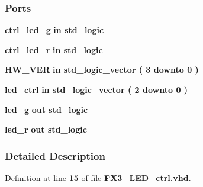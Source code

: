 \subsubsection*{Ports}
 \begin{DoxyCompactItemize}
\item 
{\bf ctrl\+\_\+led\+\_\+g}  {\bfseries {\bfseries \textcolor{keywordflow}{in}\textcolor{vhdlchar}{ }}} {\bfseries \textcolor{comment}{std\+\_\+logic}\textcolor{vhdlchar}{ }} 
\item 
{\bf ctrl\+\_\+led\+\_\+r}  {\bfseries {\bfseries \textcolor{keywordflow}{in}\textcolor{vhdlchar}{ }}} {\bfseries \textcolor{comment}{std\+\_\+logic}\textcolor{vhdlchar}{ }} 
\item 
{\bf H\+W\+\_\+\+V\+ER}  {\bfseries {\bfseries \textcolor{keywordflow}{in}\textcolor{vhdlchar}{ }}} {\bfseries \textcolor{comment}{std\+\_\+logic\+\_\+vector}\textcolor{vhdlchar}{ }\textcolor{vhdlchar}{(}\textcolor{vhdlchar}{ }\textcolor{vhdlchar}{ } \textcolor{vhdldigit}{3} \textcolor{vhdlchar}{ }\textcolor{keywordflow}{downto}\textcolor{vhdlchar}{ }\textcolor{vhdlchar}{ } \textcolor{vhdldigit}{0} \textcolor{vhdlchar}{ }\textcolor{vhdlchar}{)}\textcolor{vhdlchar}{ }} 
\item 
{\bf led\+\_\+ctrl}  {\bfseries {\bfseries \textcolor{keywordflow}{in}\textcolor{vhdlchar}{ }}} {\bfseries \textcolor{comment}{std\+\_\+logic\+\_\+vector}\textcolor{vhdlchar}{ }\textcolor{vhdlchar}{(}\textcolor{vhdlchar}{ }\textcolor{vhdlchar}{ } \textcolor{vhdldigit}{2} \textcolor{vhdlchar}{ }\textcolor{keywordflow}{downto}\textcolor{vhdlchar}{ }\textcolor{vhdlchar}{ } \textcolor{vhdldigit}{0} \textcolor{vhdlchar}{ }\textcolor{vhdlchar}{)}\textcolor{vhdlchar}{ }} 
\item 
{\bf led\+\_\+g}  {\bfseries {\bfseries \textcolor{keywordflow}{out}\textcolor{vhdlchar}{ }}} {\bfseries \textcolor{comment}{std\+\_\+logic}\textcolor{vhdlchar}{ }} 
\item 
{\bf led\+\_\+r}  {\bfseries {\bfseries \textcolor{keywordflow}{out}\textcolor{vhdlchar}{ }}} {\bfseries \textcolor{comment}{std\+\_\+logic}\textcolor{vhdlchar}{ }} 
\end{DoxyCompactItemize}


\subsubsection{Detailed Description}


Definition at line {\bf 15} of file {\bf F\+X3\+\_\+\+L\+E\+D\+\_\+ctrl.\+vhd}.



